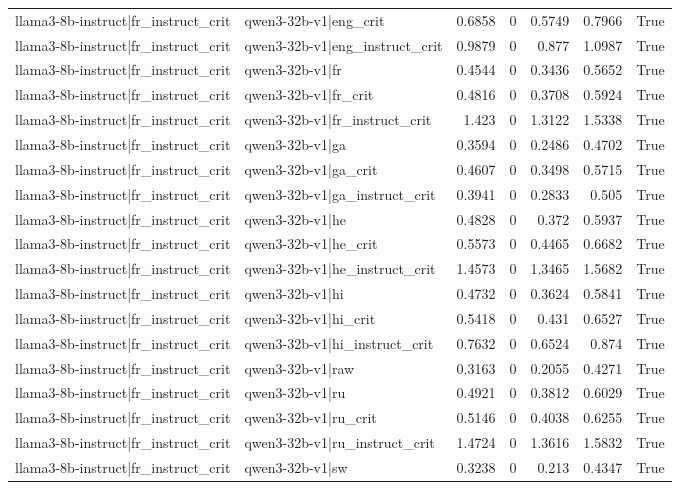 \begin{table}
\begin{tabular}{l l r r r r l}
llama3-8b-instruct|fr_instruct_crit & qwen3-32b-v1|eng_crit & 0.6858 & 0 & 0.5749 & 0.7966 & True \\
llama3-8b-instruct|fr_instruct_crit & qwen3-32b-v1|eng_instruct_crit & 0.9879 & 0 & 0.877 & 1.0987 & True \\
llama3-8b-instruct|fr_instruct_crit & qwen3-32b-v1|fr & 0.4544 & 0 & 0.3436 & 0.5652 & True \\
llama3-8b-instruct|fr_instruct_crit & qwen3-32b-v1|fr_crit & 0.4816 & 0 & 0.3708 & 0.5924 & True \\
llama3-8b-instruct|fr_instruct_crit & qwen3-32b-v1|fr_instruct_crit & 1.423 & 0 & 1.3122 & 1.5338 & True \\
llama3-8b-instruct|fr_instruct_crit & qwen3-32b-v1|ga & 0.3594 & 0 & 0.2486 & 0.4702 & True \\
llama3-8b-instruct|fr_instruct_crit & qwen3-32b-v1|ga_crit & 0.4607 & 0 & 0.3498 & 0.5715 & True \\
llama3-8b-instruct|fr_instruct_crit & qwen3-32b-v1|ga_instruct_crit & 0.3941 & 0 & 0.2833 & 0.505 & True \\
llama3-8b-instruct|fr_instruct_crit & qwen3-32b-v1|he & 0.4828 & 0 & 0.372 & 0.5937 & True \\
llama3-8b-instruct|fr_instruct_crit & qwen3-32b-v1|he_crit & 0.5573 & 0 & 0.4465 & 0.6682 & True \\
llama3-8b-instruct|fr_instruct_crit & qwen3-32b-v1|he_instruct_crit & 1.4573 & 0 & 1.3465 & 1.5682 & True \\
llama3-8b-instruct|fr_instruct_crit & qwen3-32b-v1|hi & 0.4732 & 0 & 0.3624 & 0.5841 & True \\
llama3-8b-instruct|fr_instruct_crit & qwen3-32b-v1|hi_crit & 0.5418 & 0 & 0.431 & 0.6527 & True \\
llama3-8b-instruct|fr_instruct_crit & qwen3-32b-v1|hi_instruct_crit & 0.7632 & 0 & 0.6524 & 0.874 & True \\
llama3-8b-instruct|fr_instruct_crit & qwen3-32b-v1|raw & 0.3163 & 0 & 0.2055 & 0.4271 & True \\
llama3-8b-instruct|fr_instruct_crit & qwen3-32b-v1|ru & 0.4921 & 0 & 0.3812 & 0.6029 & True \\
llama3-8b-instruct|fr_instruct_crit & qwen3-32b-v1|ru_crit & 0.5146 & 0 & 0.4038 & 0.6255 & True \\
llama3-8b-instruct|fr_instruct_crit & qwen3-32b-v1|ru_instruct_crit & 1.4724 & 0 & 1.3616 & 1.5832 & True \\
llama3-8b-instruct|fr_instruct_crit & qwen3-32b-v1|sw & 0.3238 & 0 & 0.213 & 0.4347 & True \\

\end{tabular}
\end{table}
